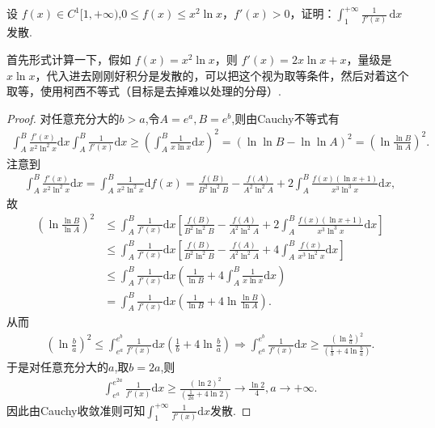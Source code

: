 \documentclass[../../main.tex]{subfiles}%
\begin{document}
\begin{example}
设 $f(x)\in C^{1}[1,+\infty)$,$0\leqslant  f(x)\leqslant  x^{2}\ln x$，$f'(x)>0$，证明：$\int_{1}^{+\infty}\frac{1}{f'(x)}\,\mathrm{d}x$ 发散.
\end{example}
\begin{note}
首先形式计算一下，假如 $f(x)=x^{2}\ln x$，则 $f'(x)=2x\ln x+x$，量级是 $x\ln x$，代入进去刚刚好积分是发散的，可以把这个视为取等条件，然后对着这个取等，使用柯西不等式（目标是去掉难以处理的分母）.
\end{note}
\begin{proof}
对任意充分大的$b>a$,令$A=e^a,B=e^b$,则由Cauchy不等式有
\begin{align*}
\int_A^B{\frac{f' \left( x \right)}{x^2\ln ^2x}\mathrm{d}x}\int_A^B{\frac{1}{f' \left( x \right)}\mathrm{d}x}\geqslant \left( \int_A^B{\frac{1}{x\ln x}\mathrm{d}x} \right) ^2=\left( \ln\ln B-\ln\ln A \right) ^2=\left( \ln \frac{\ln B}{\ln A} \right) ^2.
\end{align*}
注意到
\begin{align*}
\int_A^B{\frac{f' \left( x \right)}{x^2\ln ^2x}\mathrm{d}x}=\int_A^B{\frac{1}{x^2\ln ^2x}\mathrm{d}f\left( x \right)}=\frac{f\left( B \right)}{B^2\ln ^2B}-\frac{f\left( A \right)}{A^2\ln ^2A}+2\int_A^B{\frac{f\left( x \right) \left( \ln x+1 \right)}{x^3\ln ^3x}\mathrm{d}x},
\end{align*}
故
\begin{align*}
\left( \ln \frac{\ln B}{\ln A} \right) ^2&\leqslant \int_A^B{\frac{1}{f' \left( x \right)}\mathrm{d}x}\left[ \frac{f\left( B \right)}{B^2\ln ^2B}-\frac{f\left( A \right)}{A^2\ln ^2A}+2\int_A^B{\frac{f\left( x \right) \left( \ln x+1 \right)}{x^3\ln ^3x}\mathrm{d}x} \right] \\
&\leqslant \int_A^B{\frac{1}{f' \left( x \right)}\mathrm{d}x}\left[ \frac{f\left( B \right)}{B^2\ln ^2B}-\frac{f\left( A \right)}{A^2\ln ^2A}+4\int_A^B{\frac{f\left( x \right)}{x^3\ln ^2x}\mathrm{d}x} \right] \\
&\leqslant \int_A^B{\frac{1}{f' \left( x \right)}\mathrm{d}x}\left( \frac{1}{\ln B}+4\int_A^B{\frac{1}{x\ln x}\mathrm{d}x} \right) \\
&=\int_A^B{\frac{1}{f' \left( x \right)}\mathrm{d}x}\left( \frac{1}{\ln B}+4\ln \frac{\ln B}{\ln A} \right) .
\end{align*}
从而
\begin{align*}
\left( \ln \frac{b}{a} \right) ^2\leqslant \int_{e^a}^{e^b}{\frac{1}{f' \left( x \right)}\mathrm{d}x}\left( \frac{1}{b}+4\ln \frac{b}{a} \right)
\Rightarrow \int_{e^a}^{e^b}{\frac{1}{f' \left( x \right)}\mathrm{d}x}\geqslant \frac{\left( \ln \frac{b}{a} \right) ^2}{\left( \frac{1}{b}+4\ln \frac{b}{a} \right)}.
\end{align*}
于是对任意充分大的$a$,取$b=2a$,则
\begin{align*}
\int_{e^a}^{e^{2a}}{\frac{1}{f' \left( x \right)}\mathrm{d}x}\geqslant \frac{\left( \ln 2 \right) ^2}{\left( \frac{1}{2a}+4\ln 2 \right)}\rightarrow \frac{\ln 2}{4},a\rightarrow +\infty .
\end{align*}
因此由Cauchy收敛准则可知$\int_1^{+\infty}{\frac{1}{f' \left( x \right)}\mathrm{d}x}$发散.
\end{proof}
\end{document}
